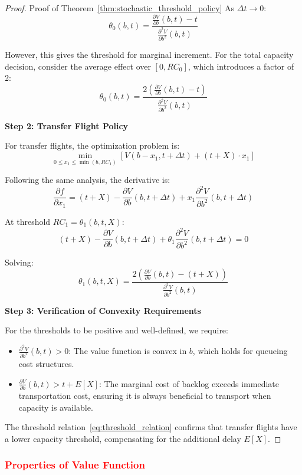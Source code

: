\documentclass[opre,sglanonrev]{informs4}
\begin{document}
{\begin{proof}{Proof of Theorem~\ref{thm:stochastic_threshold_policy}}
As \( \Delta t \to 0 \):
\[
\theta_0(b, t) = \frac{\frac{\partial V}{\partial b}(b, t) - t}{\frac{\partial^2 V}{\partial b^2}(b, t)}
\]

However, this gives the threshold for marginal increment. For the total capacity decision, consider the average effect over \( [0, R C_0] \), which introduces a factor of 2:
\[
\theta_0(b, t) = \frac{2 \left( \frac{\partial V}{\partial b}(b, t) - t \right)}{\frac{\partial^2 V}{\partial b^2}(b, t)}
\]

\textbf{Step 2: Transfer Flight Policy}

For transfer flights, the optimization problem is:
\[
\min_{0 \leq x_1 \leq \min(b, R C_1)} \left[ V(b - x_1, t + \Delta t) + (t + X) \cdot x_1 \right]
\]

Following the same analysis, the derivative is:
\[
\frac{\partial f}{\partial x_1} = (t + X) - \frac{\partial V}{\partial b}(b, t + \Delta t) + x_1 \frac{\partial^2 V}{\partial b^2}(b, t + \Delta t)
\]

At threshold \( R C_1 = \theta_1(b, t, X) \):
\[
(t + X) - \frac{\partial V}{\partial b}(b, t + \Delta t) + \theta_1 \frac{\partial^2 V}{\partial b^2}(b, t + \Delta t) = 0
\]

Solving:
\[
\theta_1(b, t, X) = \frac{2 \left( \frac{\partial V}{\partial b}(b, t) - (t + X) \right)}{\frac{\partial^2 V}{\partial b^2}(b, t)}
\]

\textbf{Step 3: Verification of Convexity Requirements}

For the thresholds to be positive and well-defined, we require:
\begin{itemize}
    \item \( \frac{\partial^2 V}{\partial b^2}(b, t) > 0 \): The value function is convex in \( b \), which holds for queueing cost structures.
    \item \( \frac{\partial V}{\partial b}(b, t) > t + E[X] \): The marginal cost of backlog exceeds immediate transportation cost, ensuring it is always beneficial to transport when capacity is available.
\end{itemize}

The threshold relation~\eqref{eq:threshold_relation} confirms that transfer flights have a lower capacity threshold, compensating for the additional delay \( E[X] \).
\end{proof}
}

\subsubsection{\textcolor{red}{Properties of Value Function}}
\end{document}
